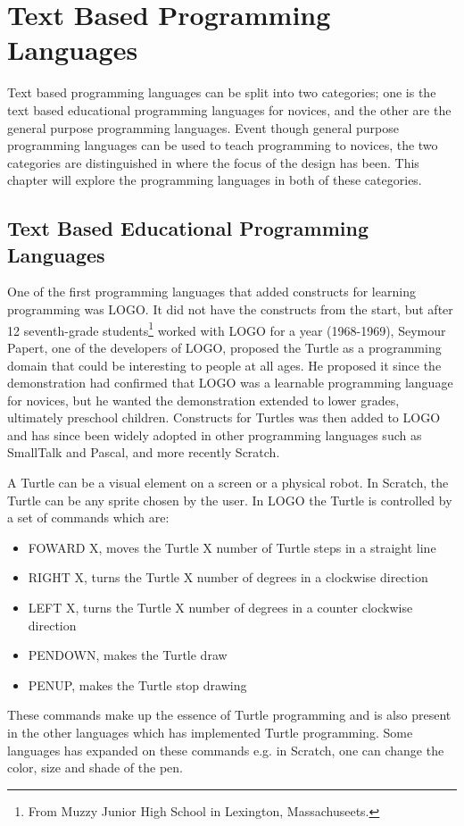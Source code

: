 \section{Text Based Programming Languages}
\label{sec:text_based_programming_languages}
Text based programming languages can be split into two categories; one is the text based educational programming languages for novices, and the other are the general purpose programming languages. Event though general purpose programming languages can be used to teach programming to novices, the two categories are distinguished in where the focus of the design has been. This chapter will explore the programming languages in both of these categories.

\subsection{Text Based Educational Programming Languages}
One of the first programming languages that added constructs for learning programming was LOGO. It did not have the constructs from the start, but after 12 seventh-grade students\footnote{From Muzzy Junior High School in Lexington, Massachuseets.} worked with LOGO for a year (1968-1969), Seymour Papert, one of the developers of LOGO, proposed the Turtle as a programming domain that could be interesting to people at all ages. He proposed it since the demonstration had confirmed that LOGO was a learnable programming language for novices, but he wanted the demonstration extended to lower grades, ultimately preschool children. Constructs for Turtles was then added to LOGO and has since been widely adopted in other programming languages such as SmallTalk and Pascal, and more recently Scratch.

A Turtle can be a visual element on a screen or a physical robot. In Scratch, the Turtle can be any sprite chosen by the user. In LOGO the Turtle is controlled by a set of commands which are:
\begin{itemize}
\item FOWARD X, moves the Turtle X number of Turtle steps in a straight line
\item RIGHT X, turns the Turtle X number of degrees in a clockwise direction
\item LEFT X, turns the Turtle X number of degrees in a counter clockwise direction
\item PENDOWN, makes the Turtle draw
\item PENUP, makes the Turtle stop drawing
\end{itemize}
These commands make up the essence of Turtle programming and is also present in the other languages which has implemented Turtle programming. Some languages has expanded on these commands e.g. in Scratch, one can change the color, size and shade of the pen.

